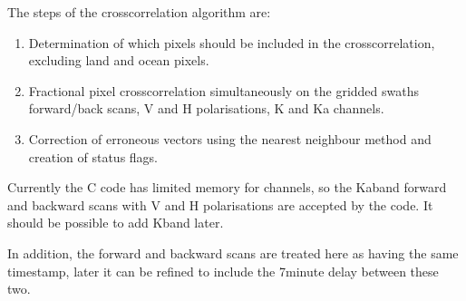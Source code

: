 \documentclass[letterpaper,10pt,english]{jupyterBook}
\begin{document}
\sphinxAtStartPar
The steps of the cross\sphinxhyphen{}correlation algorithm are:
\begin{enumerate}
%
\item {} 
\sphinxAtStartPar
Determination of which pixels should be included in the cross\sphinxhyphen{}correlation, excluding land and ocean pixels.

\item {} 
\sphinxAtStartPar
Fractional pixel cross\sphinxhyphen{}correlation simultaneously on the gridded swaths \sphinxhyphen{} forward/back scans, V and H polarisations, K and Ka channels.

\item {} 
\sphinxAtStartPar
Correction of erroneous vectors using the nearest neighbour method and creation of status flags.

\end{enumerate}

\sphinxAtStartPar
Currently the C code has limited memory for channels, so the Ka\sphinxhyphen{}band forward and backward scans with V and H polarisations are accepted by the code. It should be possible to add K\sphinxhyphen{}band later.

\sphinxAtStartPar
In addition, the forward and backward scans are treated here as having the same timestamp, later it can be refined to include the 7\sphinxhyphen{}minute delay between these two.
\end{document}
